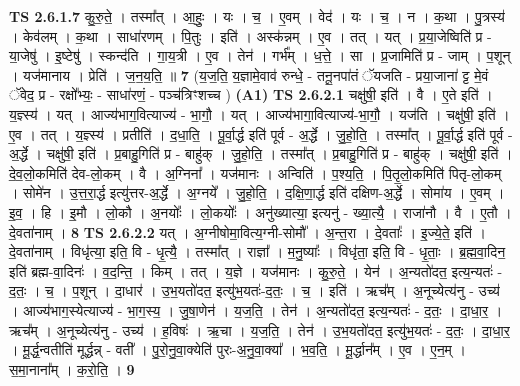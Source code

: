 \documentclass[17pt]{extarticle}
\begin{document}
                  \newline
                                \textbf{ TS 2.6.1.7} \newline
                  कु॒रु॒ते॒ । तस्मा᳚त् । आ॒हुः॒ । यः । च॒ । ए॒वम् । वेद॑ । यः । च॒ । न । क॒था । पु॒त्रस्य॑ । केव॑लम् । क॒था । साधा॑रणम् । पि॒तुः । इति॑ । अस्क॑न्नम् । ए॒व । तत् । यत् । प्र॒या॒जेष्विति॑ प्र - या॒जेषु॑ । इ॒ष्टेषु॑ । स्कन्द॑ति । गा॒य॒त्री । ए॒व । तेन॑ । गर्भ᳚म् । ध॒त्ते॒ । सा । प्र॒जामिति॑ प्र - जाम् । प॒शून् । यज॑मानाय । प्रेति॑ । ज॒न॒य॒ति॒ ॥ \textbf{  7} \newline
                  \newline
                      (य॒ज॒ति॒ य॒ज्ञामे॒वाव॑ रुन्धे॒ - तनू॒नपा॑तं ॅयजति - प्रया॒जाना॑ ट्ट मे॒वं ॅवेद॒ प्र - रक्षो᳚भ्यः॒ - साधा॑रणं॒ - पञ्च॑त्रिꣳशच्च )  \textbf{(A1)} \newline \newline
                                \textbf{ TS 2.6.2.1} \newline
                  चक्षु॑षी॒ इति॑ । वै । ए॒ते इति॑ । य॒ज्ञ्स्य॑ । यत् । आज्य॑भाग॒वित्याज्य॑ - भा॒गौ॒ । यत् । आज्य॑भागा॒वित्याज्य॑-भा॒गौ॒ । यज॑ति । चक्षु॑षी॒ इति॑ । ए॒व । तत् । य॒ज्ञ्स्य॑ । प्रतीति॑ । द॒धा॒ति॒ । पू॒र्वा॒र्द्ध इति॑ पूर्व - अ॒र्द्धे । जु॒हो॒ति॒ । तस्मा᳚त् । पू॒र्वा॒र्द्ध इति॑ पूर्व - अ॒र्द्धे । चक्षु॑षी॒ इति॑ । प्र॒बाहु॒गिति॑ प्र - बाहु॑क् । जु॒हो॒ति॒ । तस्मा᳚त् । प्र॒बाहु॒गिति॑ प्र - बाहु॑क् । चक्षु॑षी॒ इति॑ । दे॒व॒लो॒कमिति॑ देव-लो॒कम् । वै । अ॒ग्निना᳚ । यज॑मानः । अन्विति॑ । प॒श्य॒ति॒ । पि॒तृ॒लो॒कमिति॑ पितृ-लो॒कम् । सोमे॑न । उ॒त्त॒रा॒र्द्ध इत्यु॑त्तर-अ॒र्द्धे । अ॒ग्नये᳚ । जु॒हो॒ति॒ । द॒क्षि॒णा॒र्द्ध इति॑ दक्षिण-अ॒र्द्धे । सोमा॑य । ए॒वम् । इ॒व॒ । हि । इ॒मौ । लो॒कौ । अ॒नयोः᳚ । लो॒कयोः᳚ । अनु॑ख्यात्या॒ इत्यनु॑ - ख्या॒त्यै॒ । राजा॑नौ । वै । ए॒तौ । दे॒वता॑नाम् । \textbf{  8} \newline
                  \newline
                                \textbf{ TS 2.6.2.2} \newline
                  यत् । अ॒ग्नीषोमा॒वित्य॒ग्नी-सोमौ᳚ । अ॒न्त॒रा । दे॒वताः᳚ । इ॒ज्ये॒ते॒ इति॑ । दे॒वता॑नाम् । विधृ॑त्या॒ इति॒ वि - धृ॒त्यै॒ । तस्मा᳚त् । राज्ञा᳚ । म॒नु॒ष्याः᳚ । विधृ॑ता॒ इति॒ वि - धृ॒ताः॒ । ब्र॒ह्म॒वा॒दिन॒ इति॑ ब्रह्म-वा॒दिनः॑ । व॒द॒न्ति॒ । किम् । तत् । य॒ज्ञे । यज॑मानः । कु॒रु॒ते॒ । येन॑ । अ॒न्यतो॑दत॒ इत्य॒न्यतः॑ - द॒तः॒ । च॒ । प॒शून् । दा॒धार॑ । उ॒भ॒यतो॑दत॒ इत्यु॑भ॒यतः॑-द॒तः॒ । च॒ । इति॑ । ऋच᳚म् । अ॒नूच्येत्य॑नु - उच्य॑ । आज्य॑भाग॒स्येत्याज्य॑ - भा॒ग॒स्य॒ । जु॒षा॒णेन॑ । य॒ज॒ति॒ । तेन॑ । अ॒न्यतो॑दत॒ इत्य॒न्यतः॑ - द॒तः॒ । दा॒धा॒र॒ । ऋच᳚म् । अ॒नूच्येत्य॑नु - उच्य॑ । ह॒विषः॑ । ऋ॒चा । य॒ज॒ति॒ । तेन॑ । उ॒भ॒यतो॑दत॒ इत्यु॑भ॒यतः॑ - द॒तः॒ । दा॒धा॒र॒ । मू॒र्द्ध॒न्वतीति॑ मूर्द्धन्न् - वती᳚ । पु॒रो॒नु॒वा॒क्येति॑ पुरः-अ॒नु॒वा॒क्या᳚ । भ॒व॒ति॒ । मू॒र्द्धान᳚म् । ए॒व । ए॒न॒म् । स॒मा॒नाना᳚म् । क॒रो॒ति॒ । \textbf{  9} \newline
\end{document}
